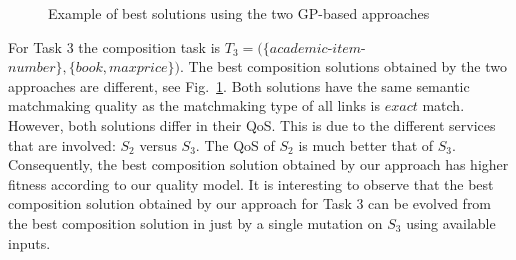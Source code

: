 

\begin{figure}[h!tb]
\centering
 \caption{Example of best solutions using the two GP-based approaches}
 \label{example1and2}
\end{figure}
\noindent For Task 3 the composition task is $T_3=(\{academic$-$item$-$number\},\{ book, maxprice\})$. The best composition solutions obtained by the two approaches are different, see Fig.~\ref{example1and2}. Both solutions have the same semantic matchmaking quality as the matchmaking type of all links is $exact$ match. However, both solutions differ in their QoS. This is due to the different services that are involved: $S_2$ versus $S_3$. The QoS of $S_2$ is much better that of $S_3$. Consequently, the best composition solution obtained by our approach has higher fitness according to our quality model.  It is interesting to observe that the best composition solution obtained by our approach for Task 3 can be evolved from the best composition solution in  \cite{ma2015hybrid} just by a single mutation on $S_3$ using available inputs.


